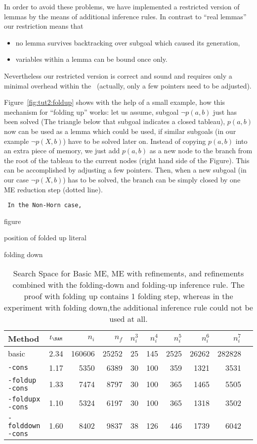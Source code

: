 In order to avoid these problems, we have implemented a restricted
version of lemmas by the means of additional inference rules.
In contrast to ``real lemmas'' our restriction means that
\begin{itemize}
\item
	no lemma survives backtracking over subgoal which caused its
	generation,
\item
	variables within a lemma can be bound once only.
\end{itemize}
Nevertheless our restricted version is correct and sound and requires
only a minimal overhead within the \SAM\  (actually, only a few pointers
need to be adjusted).

Figure~\ref{fig:tut2:foldup} shows with the help of a small example,
how this mechanism for ``folding up'' works: let us assume, subgoal
$\neg p(a,b)$ just has been solved (The triangle below that subgoal
indicates a closed tableau), $p(a,b)$ now can be used as a lemma
which could be used, if similar subgoals (in our example $\neg p(X,b)$)
have to be solved later on. 
Instead of copying $p(a,b)$ into an extra piece of memory, we just
add $p(a,b)$ as a new node to the branch from the root of the
tableau to the current nodes (right hand side of the Figure). This
can be accomplished by adjusting a few pointers. Then, when a new subgoal
(in our case $\neg p(X,b)$) has to be solved, the branch can be simply
closed by one ME reduction step (dotted line). 

{\tt
In the Non-Horn case, 

figure

position of folded up literal

folding down
}

\begin{table}[htb]
\begin{center}
\begin{tabular}{|l|r|r|r||r|r|r|r|r|r|}
\hline
Method & $t_{\SAM}$ & $n_i$ & $n_f$ & 
	$n_i^3$ & $n_i^4$ & $n_i^5$ & $n_i^6$ & $n_i^7$ \\
\hline\hline
basic & 2.34 & 160606 & 25252 &
	25 & 145 & 2525 & 26262 & 282828 \\
\hline
{\tt -cons} & 1.17 & 5350 & 6389 &
	30 & 100 & 359 & 1321 & 3531 \\
\hline
{\tt -foldup -cons} & 1.33 & 7474 & 8797 &
	30 & 100 & 365 & 1465 & 5505 \\
\hline
{\tt -foldupx -cons} & 1.10 & 5324 & 6197 &
	30 & 100 & 365 & 1318 & 3502 \\
\hline
{\tt -folddown -cons} & 1.60 & 8402 & 9837 &
	38 & 126 & 446 & 1739 & 6042 \\
\hline\hline
\end{tabular}
\end{center}
\caption{Search Space for Basic ME, ME with refinements, and refinements
combined with the folding-down and folding-up inference rule. The proof with
folding up contains 1 folding step, whereas in the experiment with folding down,the additional inference rule could not be used at all.}
\label{tab:tut2:results.fold}
\end{table}


